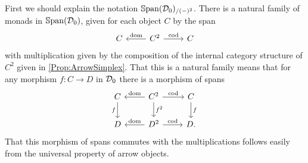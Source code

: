 First we should explain the notation $\mathbb{S}\mathrm{pan}(\mathcal{D}_0)_{/(-)^2}$. There is a natural family of monads in $\mathbb{S}\mathrm{pan}(\mathcal{D}_0)$, given for each object $C$ by the span
\[
\begin{tikzcd}
	C & C^2 \lar[swap]{\dom} \rar{\cod} & C
\end{tikzcd}
\]
with multiplication given by the composition of the internal category structure of $C^2$ given in \cref{Prop:ArrowSimplex}. That this is a natural family means that for any morphism $f\colon C\to D$ in $\mathcal{D}_0$ there is a morphism of spans
\[
\begin{tikzcd}
	C \dar[swap]{f} & C^2 \lar[swap]{\dom} \rar{\cod} \dar{f^2} & C \dar{f} \\
	D & D^2 \lar[swap]{\dom} \rar{\cod} & D.
\end{tikzcd}
\]
That this morphism of spans commutes with the multiplications follows easily from the universal property of arrow objects.

